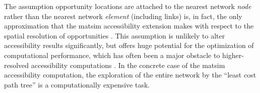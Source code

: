 %
%

%

The assumption opportunity locations are attached to the nearest network \emph{node} rather than the nearest 
network \emph{element} (\eg including links) is, in fact, the only approximation that the \gls{matsim}
accessibility extension makes with respect to the spatial resolution of opportunities 
\citep{NicolaiNagel2012HiResAccessibilityMethodInBook}. This assumption is unlikely to alter accessibility 
results significantly, but offers huge potential for the
optimization of computational performance, which has often been a major obstacle to higher-resolved 
accessibility computations \citep{Kwan1998PointBasedAccessibility, BuettnerEtAl2010Erreichbarkeitsatlas}. 
In the concrete case of the \gls{matsim} accessibility computation, the exploration of the entire network 
by the ``least cost path tree'' is a computationally expensive task.

